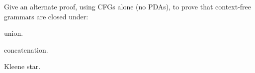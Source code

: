 \begin{problem}
  Give an alternate proof, using CFGs alone (no PDAs),
  to prove that context-free grammars are closed under:
  \begin{enumalph}
    \item union.
    \item concatenation.
    \item Kleene star.
  \end{enumalph}
\end{problem}
